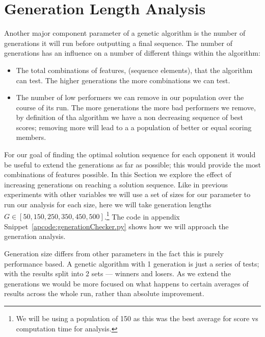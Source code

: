 \section{Generation Length Analysis}\label{sec:generationlengthanalysis}
Another major component parameter of a genetic algorithm is the number of generations it will run before outputting a final sequence.
The number of generations has an influence on a number of different things within the algorithm:

\begin{itemize}
    \item The total combinations of features, (sequence elements), that the algorithm can test. The higher generations the more combinations we can test.
    \item The number of low performers we can remove in our population over the course of its run. The more generations the more bad performers we remove, by definition of tha algorithm we have a non decreasing sequence of best scores; removing more will lead to a a population of better or equal scoring members. 
\end{itemize}

For our goal of finding the optimal solution sequence for each opponent it would be useful to extend the generations as far as possible;
this would provide the most combinations of features possible.
In this Section we explore the effect of increasing generations on reaching a solution sequence.
Like in previous experiments with other variables we will use a set of sizes for our parameter to run our analysis for each size, here we will take generation lengths \(G \in [50,150,250,350,450,500]\).\footnote{We will be using a population of 150 as this was the best average for score vs computation time for analysis.}
The code in appendix Snippet~\ref{apcode:generationChecker.py} shows how we will approach the generation analysis.

Generation size differs from other parameters in the fact this is purely performance based.
A genetic algorithm with 1 generation is just a series of tests;
with the results split into 2 sets --- winners and losers.
As we extend the generations we would be more focused on what happens to certain averages of results across the whole run, rather than absolute improvement.

